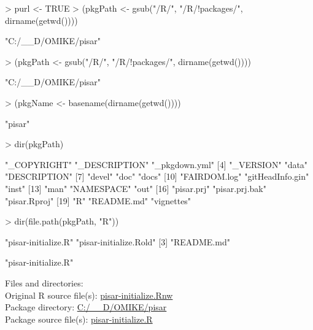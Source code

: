 \documentclass[a4paper,12pt]{article}\usepackage[]{graphicx}\usepackage[]{color}
\begin{document}
\begin{Schunk}
\begin{Sinput}
> purl <- TRUE
> (pkgPath <- gsub("/R/", "/R/!packages/", dirname(getwd())))
\end{Sinput}
\begin{Soutput}
[1] "C:/__D/OMIKE/pisar"
\end{Soutput}
\begin{Sinput}
> (pkgPath <- gsub("/R/", "/R/!packages/", dirname(getwd())))
\end{Sinput}
\begin{Soutput}
[1] "C:/__D/OMIKE/pisar"
\end{Soutput}
\begin{Sinput}
> (pkgName <- basename(dirname(getwd())))
\end{Sinput}
\begin{Soutput}
[1] "pisar"
\end{Soutput}
\begin{Sinput}
> dir(pkgPath)
\end{Sinput}
\begin{Soutput}
 [1] "_COPYRIGHT"      "_DESCRIPTION"    "_pkgdown.yml"   
 [4] "_VERSION"        "data"            "DESCRIPTION"    
 [7] "devel"           "doc"             "docs"           
[10] "FAIRDOM.log"     "gitHeadInfo.gin" "inst"           
[13] "man"             "NAMESPACE"       "out"            
[16] "pisar.prj"       "pisar.prj.bak"   "pisar.Rproj"    
[19] "R"               "README.md"       "vignettes"      
\end{Soutput}
\begin{Sinput}
> dir(file.path(pkgPath, "R"))
\end{Sinput}
\begin{Soutput}
[1] "pisar-initialize.R"    "pisar-initialize.Rold"
[3] "README.md"            
\end{Soutput}
\begin{Soutput}
[1] "pisar-initialize.R"
\end{Soutput}
\end{Schunk}

Files and directories:\\[12pt]
Original R source file(s): \url{pisar-initialize.Rnw}\\
Package directory: \url{C:/__D/OMIKE/pisar}\\
Package source file(s): \url{pisar-initialize.R}
\end{document}
